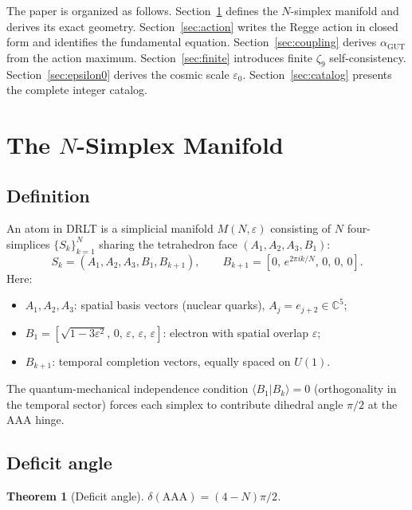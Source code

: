\documentclass[12pt]{article}
\newtheorem{theorem}{Theorem}[section]
\theoremstyle{definition}
\theoremstyle{remark}
\newcommand{\CC}{\mathbb{C}}
\newcommand{\agut}{\alpha_{\mathrm{GUT}}}
\begin{document}
The paper is organized as follows. Section~\ref{sec:manifold} defines
the $N$-simplex manifold and derives its exact geometry. Section~\ref{sec:action}
writes the Regge action in closed form and identifies the fundamental equation.
Section~\ref{sec:coupling} derives $\agut$ from the action maximum.
Section~\ref{sec:finite} introduces finite $\zeta_9$ self-consistency.
Section~\ref{sec:epsilon0} derives the cosmic scale $\varepsilon_0$.
Section~\ref{sec:catalog} presents the complete integer catalog.

\section{The $N$-Simplex Manifold}
\label{sec:manifold}

\subsection{Definition}

An atom in DRLT is a simplicial manifold $M(N,\varepsilon)$ consisting of
$N$ four-simplices $\{S_k\}_{k=1}^N$ sharing the tetrahedron face
$(A_1,A_2,A_3,B_1)$:
\begin{equation}
S_k = (A_1,A_2,A_3,B_1,B_{k+1}), \qquad B_{k+1} = [0,\, e^{2\pi ik/N},\, 0,\, 0,\, 0].
\end{equation}
Here:
\begin{itemize}
\item $A_1,A_2,A_3$: spatial basis vectors (nuclear quarks),
  $A_j = e_{j+2} \in \CC^5$;
\item $B_1 = [\sqrt{1-3\varepsilon^2},\, 0,\, \varepsilon,\, \varepsilon,\, \varepsilon]$:
  electron with spatial overlap $\varepsilon$;
\item $B_{k+1}$: temporal completion vectors, equally spaced on $U(1)$.
\end{itemize}

The quantum-mechanical independence condition $\langle B_1|B_k\rangle = 0$
(orthogonality in the temporal sector) forces each simplex to contribute
dihedral angle $\pi/2$ at the AAA hinge.

\subsection{Deficit angle}

\begin{theorem}[Deficit angle]
\label{thm:deficit}
$\delta(\text{AAA}) = (4-N)\pi/2$.
\end{theorem}
\end{document}
